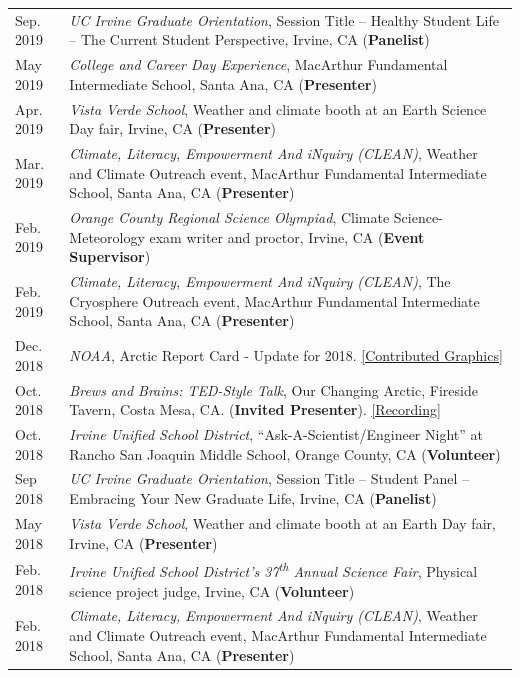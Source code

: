 \documentclass[margin,line,palatino,courier,10pt]{res}
\begin{document}
\begin{resume}
\begin{tabular}{@{}p{0.9in}p{4in}}
Sep. 2019 & \textit{UC Irvine Graduate Orientation}, Session Title -- Healthy Student Life -- The Current Student Perspective, Irvine, CA (\textbf{Panelist})\\
May 2019 & \textit{College and Career Day Experience}, MacArthur Fundamental Intermediate School, Santa Ana, CA (\textbf{Presenter})\\
Apr. 2019 & \textit{Vista Verde School}, Weather and climate booth at an Earth Science Day fair, Irvine, CA (\textbf{Presenter})\\
Mar. 2019 & \textit{Climate, Literacy, Empowerment And iNquiry (CLEAN)}, Weather and Climate Outreach event, MacArthur Fundamental Intermediate School, Santa Ana, CA (\textbf{Presenter})\\
Feb. 2019 & \textit{Orange County Regional Science Olympiad}, Climate Science-Meteorology exam writer and proctor, Irvine, CA (\textbf{Event Supervisor})\\
Feb. 2019 & \textit{Climate, Literacy, Empowerment And iNquiry (CLEAN)}, The Cryosphere Outreach event, MacArthur Fundamental Intermediate School, Santa Ana, CA (\textbf{Presenter})\\
Dec. 2018 & \textit{NOAA}, Arctic Report Card - Update for 2018. \href{https://www.youtube.com/watch?v=XntO9a-NpeM}{[Contributed Graphics]}\\
Oct. 2018 & \textit{Brews and Brains: TED-Style Talk}, Our Changing Arctic, Fireside Tavern, Costa Mesa, CA. (\textbf{Invited Presenter}). \href{https://www.youtube.com/watch?v=A5qQpDtOdvg}{[Recording]}\\
Oct. 2018 & \textit{Irvine Unified School District}, ``Ask-A-Scientist/Engineer Night'' at Rancho San Joaquin Middle School, Orange County, CA (\textbf{Volunteer})\\
Sep 2018 & \textit{UC Irvine Graduate Orientation}, Session Title -- Student Panel -- Embracing Your New Graduate Life, Irvine, CA (\textbf{Panelist})\\
May 2018 & \textit{Vista Verde School}, Weather and climate booth at an Earth Day fair, Irvine, CA (\textbf{Presenter})\\
Feb. 2018 & \textit{Irvine Unified School District's 37\textsuperscript{th} Annual Science Fair}, Physical science project judge, Irvine, CA (\textbf{Volunteer})\\
Feb. 2018 & \textit{Climate, Literacy, Empowerment And iNquiry (CLEAN)}, Weather and Climate Outreach event, MacArthur Fundamental Intermediate School, Santa Ana, CA (\textbf{Presenter})\\

\end{tabular}
\end{resume}
\end{document}

